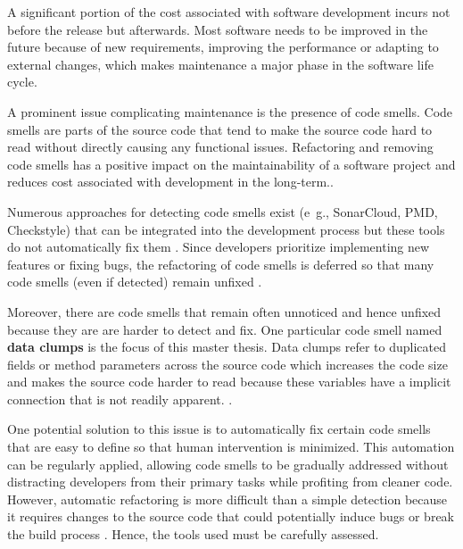 \label{sec:introduction}

A significant portion of the cost associated with software development incurs not before the release but afterwards. Most software needs to be improved in the future because of new requirements, improving the performance or adapting to external changes, which makes maintenance a major phase in the  software life cycle.


A prominent issue  complicating maintenance is the presence of code smells. Code smells are parts of the source code that tend to make the source code hard to read without directly causing any functional issues. Refactoring and removing code smells has a positive impact on the maintainability  of a software project and reduces cost associated with development in the long-term.\cite{mealyEvaluatingSoftwareRefactoring2006}.



Numerous approaches for detecting code smells exist (e~g., SonarCloud,  PMD, Checkstyle) that can be integrated into the development process but these tools do not automatically fix them  \cite{vidalApproachPrioritizeCode2016}. Since developers prioritize implementing new features or fixing bugs, the refactoring of code smells is deferred so that many code smells (even if detected) remain unfixed   \cite{10.1145/2393596.2393655}.

Moreover, there are code smells that remain often unnoticed and hence unfixed because they are are harder to detect and fix. One particular code smell named \textbf{data clumps} is the focus of this master thesis. Data clumps refer to duplicated fields or method parameters across the source code which increases the code size and makes the source code harder to read because these variables have a implicit connection that is not readily apparent.  \cite{BaumgartnerAP23}  \cite{data_clumps_refactoring_guru} \cite{join_data_items}.
 



One potential solution to this issue is to automatically fix certain code smells that are easy to define so that human intervention is minimized. This automation can be regularly applied, allowing code smells to be gradually addressed without distracting developers from their primary tasks while profiting from cleaner code. 
However,  automatic refactoring  is more difficult than a simple detection because it requires changes to the source code that could potentially induce bugs or break the build process \cite{9796303}. Hence, the tools used must be carefully assessed. 

